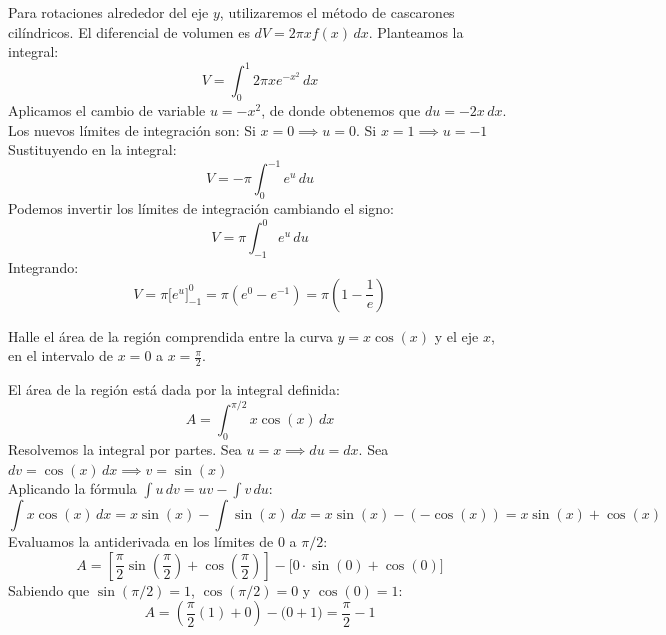 \documentclass[11pt,paper=a4,answers, addpoints]{exam}
\begin{document}
\begin{questions}
\begin{solution}
Para rotaciones alrededor del eje $y$, utilizaremos el método de cascarones cilíndricos. El diferencial de volumen es $dV = 2\pi x f(x) \, dx$.
Planteamos la integral:
\[ V = \int_0^1 2\pi x e^{-x^2} \, dx \]
Aplicamos el cambio de variable $u = -x^2$, de donde obtenemos que $du = -2x \, dx$. \\
Los nuevos límites de integración son: Si $x = 0 \implies u = 0$. \qquad Si $x = 1 \implies u = -1$ \\
Sustituyendo en la integral:
\[ V = -\pi \int_0^{-1} e^u \, du \]
Podemos invertir los límites de integración cambiando el signo:
\[ V = \pi \int_{-1}^0 e^u \, du \]
Integrando:
\[ V = \pi \Big[ e^u \Big]_{-1}^0 = \pi (e^0 - e^{-1}) = \pi \left(1 - \frac{1}{e}\right) \]
\end{solution}

\vspace{5mm}

\question Halle el área de la región comprendida entre la curva $y = x\cos(x)$ y el eje $x$, en el intervalo de $x = 0$ a $x = \frac{\pi}{2}$.


\begin{solution}
El área de la región está dada por la integral definida:
\[ A = \int_0^{\pi/2} x\cos(x) \, dx \]
Resolvemos la integral por partes. Sea $u = x \implies du = dx$. \quad Sea $dv = \cos(x) \, dx \implies v = \sin(x)$ \\
Aplicando la fórmula $\int u \, dv = uv - \int v \, du$:
\[ \int x\cos(x) \, dx = x\sin(x) - \int \sin(x) \, dx = x\sin(x) - (-\cos(x)) = x\sin(x) + \cos(x) \]
Evaluamos la antiderivada en los límites de $0$ a $\pi/2$:
\[ A = \left[ \frac{\pi}{2}\sin\left(\frac{\pi}{2}\right) + \cos\left(\frac{\pi}{2}\right) \right] - \Big[ 0\cdot\sin(0) + \cos(0) \Big] \]
Sabiendo que $\sin(\pi/2) = 1$, $\cos(\pi/2) = 0$ y $\cos(0) = 1$:
\[ A = \left( \frac{\pi}{2}(1) + 0 \right) - \Big( 0 + 1 \Big) = \frac{\pi}{2} - 1 \]
\end{solution}

\end{questions}
\end{document}
